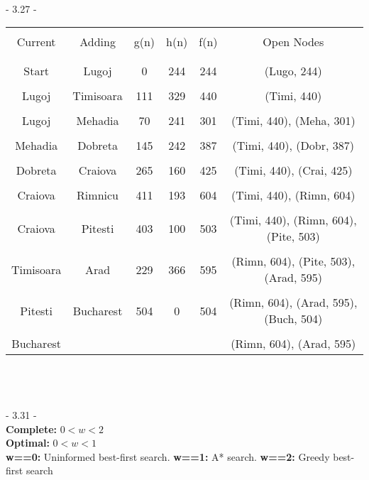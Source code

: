 \documentclass[12pt]{article}
\begin{document}
  
  
\noindent \hrulefill \\\pagebreak


- 3.27 -\\


\begin{tabular}{|c|c|c|c|c|c|}\hline &&\\[-1em]

Current & Adding & g(n) & h(n) & f(n) & Open Nodes  \\ \hline &&\\[-1em]\hline\\[-1em]

Start		& Lugoj 	& 0 	& 244 	& 244 	& (Lugo, 244) 				\\ \hline &&&&&\\[-1em]
Lugoj		& Timisoara 	& 111 & 329 	& 440 	& (Timi, 440) 				\\ \hline &&&&&\\[-1em]
Lugoj		& Mehadia 	& 70	& 241 	& 301 	& (Timi, 440), (Meha, 301) 		\\ \hline &&&&&\\[-1em]
Mehadia	& Dobreta 	& 145	& 242 	& 387 	& (Timi, 440), (Dobr, 387) 			\\ \hline &&&&&\\[-1em]
Dobreta	& Craiova 	& 265	& 160 	& 425 	& (Timi, 440), (Crai, 425) 			\\ \hline &&&&&\\[-1em]
Craiova	& Rimnicu 	& 411	& 193 	& 604 	& (Timi, 440), (Rimn, 604) 			\\ \hline &&&&&\\[-1em]
Craiova	& Pitesti 	& 403	& 100 	& 503 	& (Timi, 440), (Rimn, 604), (Pite, 503)	\\ \hline &&&&&\\[-1em]
Timisoara	& Arad 	& 229	& 366 	& 595 	& (Rimn, 604), (Pite, 503), (Arad, 595)	\\ \hline &&&&&\\[-1em]
Pitesti		& Bucharest 	& 504	& 0 	& 504 	& (Rimn, 604), (Arad, 595), (Buch, 504)\\ \hline &&&&&\\[-1em]
Bucharest	&   		& 	&  	&  	& (Rimn, 604), (Arad, 595)		\\ \hline
\end{tabular}\\\\





\noindent \hrulefill \\



- 3.31 -\\

\noindent \textbf{Complete:} $0 < w < 2$\\
\noindent \textbf{Optimal:} $0 < w < 1$\\
\noindent \textbf{w==0:} Uninformed best-first search. \textbf{w==1:} A* search. \textbf{w==2:} Greedy best-first search\\
\end{document}
